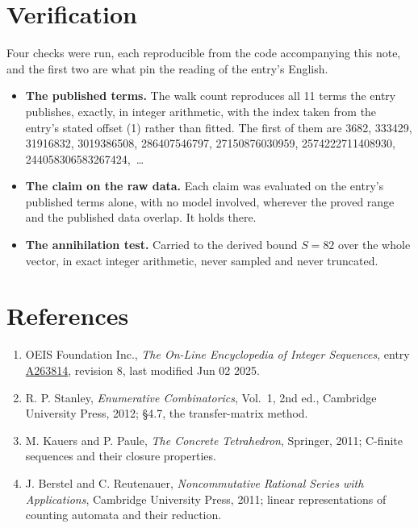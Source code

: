 \documentclass[11pt]{article}
\theoremstyle{definition}
\begin{document}
\section{Verification}

Four checks were run, each reproducible from the code accompanying this note, and the first two are what pin the reading of the entry's English.

\begin{itemize}

\item {\bfseries The published terms.} The walk count reproduces all 11 terms the entry publishes, exactly, in integer arithmetic, with the index taken from the entry's stated offset (1) rather than fitted. The first of them are 3682, 333429, 31916832, 3019386508, 286407546797, 27150876030959, 2574222711408930, 244058306583267424,~\dots

\item {\bfseries The claim on the raw data.} Each claim was evaluated on the entry's published terms alone, with no model involved, wherever the proved range and the published data overlap. It holds there.

\item {\bfseries The annihilation test.} Carried to the derived bound $S = 82$ over the whole vector, in exact integer arithmetic, never sampled and never truncated.

\end{itemize}

\section{References}

\begin{enumerate}

\item OEIS Foundation Inc., \emph{The On-Line Encyclopedia of Integer Sequences}, entry \href{https://oeis.org/A263814}{A263814}, revision 8, last modified Jun 02 2025.

\item R. P. Stanley, \emph{Enumerative Combinatorics}, Vol.~1, 2nd ed., Cambridge University Press, 2012; \S4.7, the transfer-matrix method.

\item M. Kauers and P. Paule, \emph{The Concrete Tetrahedron}, Springer, 2011; C-finite sequences and their closure properties.

\item J. Berstel and C. Reutenauer, \emph{Noncommutative Rational Series with Applications}, Cambridge University Press, 2011; linear representations of counting automata and their reduction.

\end{enumerate}
\end{document}
